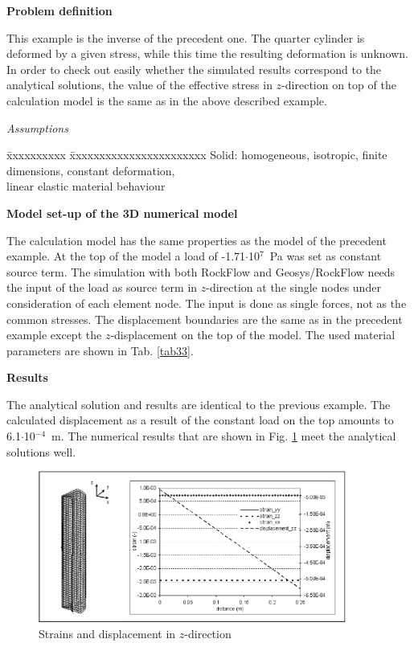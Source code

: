 
\textbf{Problem definition}

This example is the inverse of the precedent one. The quarter cylinder is deformed by a given stress, while this time the resulting deformation is unknown. In order to check out easily whether the simulated results correspond to the analytical solutions, the value of the effective stress in $z$-direction on top of the calculation model is the same as in the above described example.

\textsl{Assumptions}

\begin{tabbing}
\=xxxxxxxxxx  \=xxxxxxxxxxxxxxxxxxxxxxx \kill
\> Solid: \> homogeneous, isotropic, finite dimensions, constant deformation, \\
\> \> linear elastic material behaviour
\end{tabbing}

\textbf{Model set-up of the 3D numerical model}

The calculation model has the same properties as the model of the precedent example. At the top of the model a load of -1.71$\cdot$10$^7$~Pa was set as constant source term. The simulation with both RockFlow and Geosys/RockFlow needs the input of the load as source term in $z$-direction at the single nodes under consideration of each element node. The input is done as single forces, not as the common stresses. The displacement boundaries are the same as in the precedent example except the $z$-displacement on the top of the model. The used material parameters are shown in Tab. \ref{tab33}.


\textbf{Results}

The analytical solution and results are identical to the previous example. The calculated displacement as a result of the constant load on the top amounts to 6.1$\cdot$10$^{-4}$~m. The numerical results that are shown in Fig. \ref{fig34} meet the analytical solutions well.

\begin{figure}[htbp]
\centering
\includegraphics[width=0.9\textwidth]{M/figures/fig34.eps}
\caption{Strains and displacement in $z$-direction}
\label{fig34}
\end{figure}

